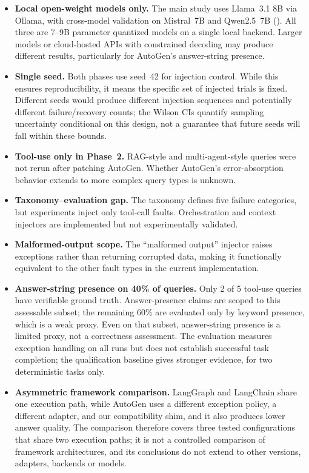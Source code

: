 \documentclass[make,article,submit,moreauthors,pdftex]{mdpi}
\newcommand{\Wrev}[1]{\texorpdfstring{{\color{RevisionOrange}#1}}{#1}}
\begin{document}
\begin{itemize}
  \item {\textbf{Local open-weight models only.} The main study uses Llama~3.1 8B via Ollama, with cross-model validation on Mistral~7B and Qwen2.5~7B (). All three are 7--9B parameter quantized models on a single local backend. Larger models or cloud-hosted APIs with constrained decoding may produce different results, particularly for AutoGen's answer-string presence.}
  \item {\textbf{Single seed.} Both phases use seed~42 for injection control. While this ensures reproducibility, it means the specific set of injected trials is fixed. Different seeds would produce different injection sequences and potentially different failure/recovery counts; the Wilson CIs quantify sampling uncertainty conditional on this design, not a guarantee that future seeds will fall within these bounds.}
  \item {\textbf{Tool-use only in Phase~2.} RAG-style and multi-agent-style queries were not rerun after patching AutoGen. Whether AutoGen's error-absorption behavior extends to more complex query types is unknown.}
  \item {\textbf{Taxonomy--evaluation gap.} The taxonomy defines five failure categories, but experiments inject only tool-call faults. Orchestration and context injectors are implemented but not experimentally validated.}
  \item {\textbf{Malformed-output scope.} The ``malformed output'' injector raises exceptions rather than returning corrupted data, making it functionally equivalent to the other fault types in the current implementation.}
  \item {\textbf{Answer-string presence on 40\% of queries.} Only 2 of 5 tool-use queries have verifiable ground truth. Answer-presence claims are scoped to this assessable subset; the remaining 60\% are evaluated only by keyword presence, which is a weak proxy.} \Wrev{Even on that subset, answer-string presence is a limited proxy, not a correctness assessment. The evaluation measures exception handling on all runs but does not establish successful task completion; the qualification baseline gives stronger evidence, for two deterministic tasks only.}
  \item \Wrev{\textbf{Asymmetric framework comparison.} LangGraph and LangChain share one execution path, while AutoGen uses a different exception policy, a different adapter, and our compatibility shim, and it also produces lower answer quality. The comparison therefore covers three tested configurations that share two execution paths; it is not a controlled comparison of framework architectures, and its conclusions do not extend to other versions, adapters, backends or models.}

\end{itemize}
\end{document}

